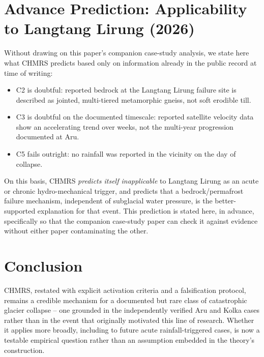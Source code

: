 \documentclass[11pt,twocolumn]{article}
\begin{document}
\section{Advance Prediction: Applicability to Langtang Lirung (2026)}
Without drawing on this paper's companion case-study analysis, we state here what CHMRS predicts based only on information already in the public record at time of writing:
\begin{itemize}
\item C2 is doubtful: reported bedrock at the Langtang Lirung failure site is described as jointed, multi-tiered metamorphic gneiss, not soft erodible till.
\item C3 is doubtful on the documented timescale: reported satellite velocity data show an accelerating trend over weeks, not the multi-year progression documented at Aru.
\item C5 fails outright: no rainfall was reported in the vicinity on the day of collapse.
\end{itemize}
On this basis, CHMRS \emph{predicts itself inapplicable} to Langtang Lirung as an acute or chronic hydro-mechanical trigger, and predicts that a bedrock/permafrost failure mechanism, independent of subglacial water pressure, is the better-supported explanation for that event. This prediction is stated here, in advance, specifically so that the companion case-study paper can check it against evidence without either paper contaminating the other.

\section{Conclusion}
CHMRS, restated with explicit activation criteria and a falsification protocol, remains a credible mechanism for a documented but rare class of catastrophic glacier collapse -- one grounded in the independently verified Aru and Kolka cases rather than in the event that originally motivated this line of research. Whether it applies more broadly, including to future acute rainfall-triggered cases, is now a testable empirical question rather than an assumption embedded in the theory's construction.
\end{document}
